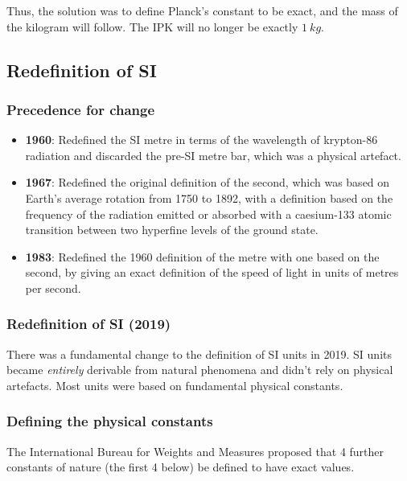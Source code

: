\documentclass[11pt]{article}
\begin{document}
Thus, the solution was to define Planck's constant to be exact, and the mass of the kilogram will follow. The IPK will no longer be exactly \(\qty{1}{kg}\).
\subsection{Redefinition of SI}
\label{sec:org8ca71f6}

\subsubsection{Precedence for change}
\label{sec:org5a4f6e2}
\begin{itemize}
\item \textbf{1960}: Redefined the SI metre in terms of the wavelength of krypton-86 radiation and discarded the pre-SI metre bar, which was a physical artefact.
\item \textbf{1967}: Redefined the original definition of the second, which was based on Earth's average rotation from 1750 to 1892, with a definition based on the frequency of the radiation emitted or absorbed with a caesium-133 atomic transition between two hyperfine levels of the ground state.
\item \textbf{1983}: Redefined the 1960 definition of the metre with one based on the second, by giving an exact definition of the speed of light in units of metres per second.
\end{itemize}
\subsubsection{Redefinition of SI (2019)}
\label{sec:org56458d3}
There was a fundamental change to the definition of SI units in 2019. SI units became \emph{entirely} derivable from natural phenomena and didn't rely on physical artefacts. Most units were based on fundamental physical constants.

\newpage
\subsubsection{Defining the physical constants}
\label{sec:orga417b13}
The International Bureau for Weights and Measures proposed that 4 further constants of nature (the first 4 below) be defined to have exact values.
\end{document}
